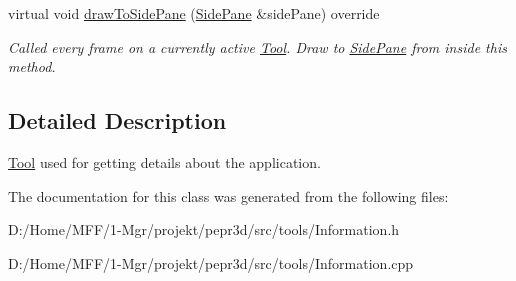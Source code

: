 \begin{DoxyCompactItemize}
\mbox{\label{classpepr3d_1_1_information_aaf1074d0f4f7055de706d8561ce14ed2}} 
virtual void \mbox{\hyperlink{classpepr3d_1_1_information_aaf1074d0f4f7055de706d8561ce14ed2}{draw\+To\+Side\+Pane}} (\mbox{\hyperlink{classpepr3d_1_1_side_pane}{Side\+Pane}} \&side\+Pane) override
\begin{DoxyCompactList}\small\item\em Called every frame on a currently active \mbox{\hyperlink{classpepr3d_1_1_tool}{Tool}}. Draw to \mbox{\hyperlink{classpepr3d_1_1_side_pane}{Side\+Pane}} from inside this method. \end{DoxyCompactList}\end{DoxyCompactItemize}


\subsection{Detailed Description}
\mbox{\hyperlink{classpepr3d_1_1_tool}{Tool}} used for getting details about the application. 

The documentation for this class was generated from the following files\+:\begin{DoxyCompactItemize}
\item 
D\+:/\+Home/\+M\+F\+F/1-\/\+Mgr/projekt/pepr3d/src/tools/Information.\+h\item 
D\+:/\+Home/\+M\+F\+F/1-\/\+Mgr/projekt/pepr3d/src/tools/Information.\+cpp\end{DoxyCompactItemize}
